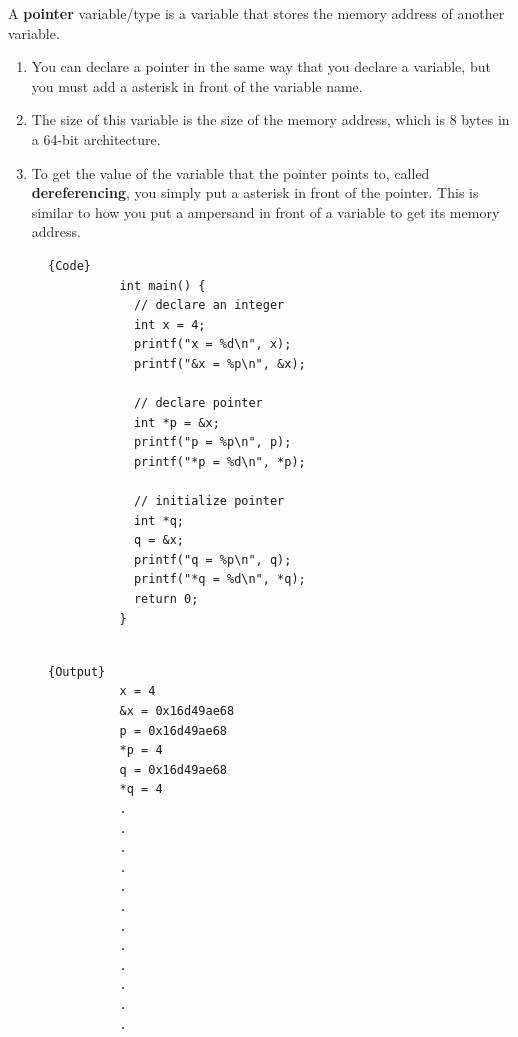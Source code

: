 \documentclass{article}
\newcounter{definition}[section]
\begin{document}
    \begin{definition}
      \label{def:pointer-variable}
      A \textbf{pointer} variable/type is a variable that stores the memory address of another variable. 
      \begin{enumerate}
        \item You can declare a pointer in the same way that you declare a variable, but you must add a asterisk in front of the variable name. 
        \item The size of this variable is the size of the memory address, which is 8 bytes in a 64-bit architecture. 
        \item To get the value of the variable that the pointer points to, called \textbf{dereferencing}, you simply put a asterisk in front of the pointer. This is similar to how you put a ampersand in front of a variable to get its memory address. 
      \end{enumerate}

      \begin{figure}[H]
        \centering 
        \noindent\begin{minipage}{.5\textwidth}
        \begin{lstlisting}[]{Code}
          int main() { 
            // declare an integer 
            int x = 4; 
            printf("x = %d\n", x); 
            printf("&x = %p\n", &x); 

            // declare pointer 
            int *p = &x; 
            printf("p = %p\n", p); 
            printf("*p = %d\n", *p); 

            // initialize pointer 
            int *q; 
            q = &x; 
            printf("q = %p\n", q); 
            printf("*q = %d\n", *q); 
            return 0; 
          }
          
        \end{lstlisting}
        \end{minipage}
        \hfill
        \begin{minipage}{.49\textwidth}
        \begin{lstlisting}[]{Output}
          x = 4
          &x = 0x16d49ae68
          p = 0x16d49ae68
          *p = 4
          q = 0x16d49ae68
          *q = 4
          .
          .
          .
          .
          .
          .
          .
          .
          .
          .
          .
          .
        \end{lstlisting}
        \end{minipage}
        \caption{} 
        \label{fig:pointer_variable}
      \end{figure}
    \end{definition}
\end{document}
